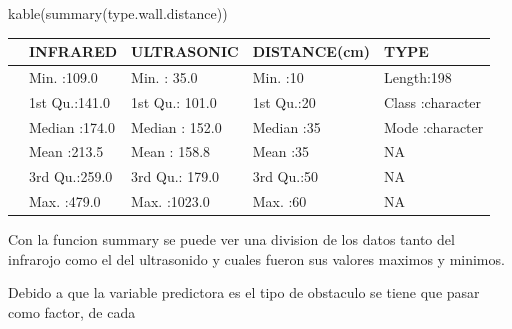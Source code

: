 \documentclass[
]{article}
\newenvironment{Shaded}{\begin{snugshade}}{\end{snugshade}}
\newcommand{\AttributeTok}[1]{\textcolor[rgb]{0.77,0.63,0.00}{#1}}
\newcommand{\DecValTok}[1]{\textcolor[rgb]{0.00,0.00,0.81}{#1}}
\newcommand{\FunctionTok}[1]{\textcolor[rgb]{0.00,0.00,0.00}{#1}}
\newcommand{\NormalTok}[1]{#1}
\newcommand{\OtherTok}[1]{\textcolor[rgb]{0.56,0.35,0.01}{#1}}
\newcommand{\SpecialCharTok}[1]{\textcolor[rgb]{0.00,0.00,0.00}{#1}}
\newcommand{\StringTok}[1]{\textcolor[rgb]{0.31,0.60,0.02}{#1}}
\begin{document}
\begin{Shaded}
\begin{Highlighting}[]
\FunctionTok{kable}\NormalTok{(}\FunctionTok{summary}\NormalTok{(type.wall.distance))}
\end{Highlighting}
\end{Shaded}

\begin{longtable}[]{@{}lllll@{}}
\toprule()
& INFRARED & ULTRASONIC & DISTANCE(cm) & TYPE \\
\midrule()
\endhead
& Min. :109.0 & Min. : 35.0 & Min. :10 & Length:198 \\
& 1st Qu.:141.0 & 1st Qu.: 101.0 & 1st Qu.:20 & Class :character \\
& Median :174.0 & Median : 152.0 & Median :35 & Mode :character \\
& Mean :213.5 & Mean : 158.8 & Mean :35 & NA \\
& 3rd Qu.:259.0 & 3rd Qu.: 179.0 & 3rd Qu.:50 & NA \\
& Max. :479.0 & Max. :1023.0 & Max. :60 & NA \\
\bottomrule()
\end{longtable}

Con la funcion summary se puede ver una division de los datos tanto del
infrarojo como el del ultrasonido y cuales fueron sus valores maximos y
minimos.

\begin{Shaded}
\end{Shaded}

Debido a que la variable predictora es el tipo de obstaculo se tiene que
pasar como factor, de cada

\begin{Shaded}
\end{Shaded}
\end{document}
